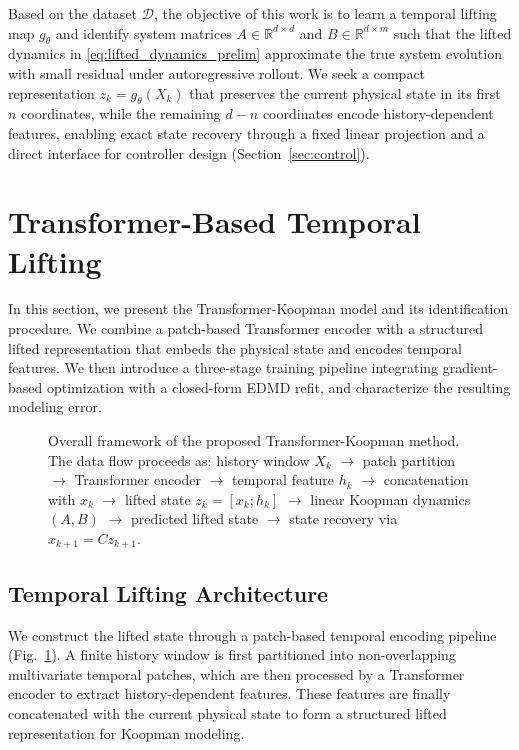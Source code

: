 \documentclass[journal]{IEEEtran}
\begin{document}
Based on the dataset $\mathcal{D}$, the objective of this work is to learn a temporal lifting map $g_\theta$ and identify system matrices $A \in \mathbb{R}^{d\times d}$ and $B \in \mathbb{R}^{d\times m}$ such that the lifted dynamics in \eqref{eq:lifted_dynamics_prelim} approximate the true system evolution with small residual under autoregressive rollout. We seek a compact representation $z_k = g_\theta(X_k)$ that preserves the current physical state in its first $n$ coordinates, while the remaining $d-n$ coordinates encode history-dependent features, enabling exact state recovery through a fixed linear projection and a direct interface for controller design (Section~\ref{sec:control}).

\section{Transformer-Based Temporal Lifting}
\label{sec:methodology}

In this section, we present the Transformer-Koopman model and its identification procedure. We combine a patch-based Transformer encoder with a structured lifted representation that embeds the physical state and encodes temporal features. We then introduce a three-stage training pipeline integrating gradient-based optimization with a closed-form EDMD refit, and characterize the resulting modeling error.

\begin{figure}[!t]
    \centering
    \caption{Overall framework of the proposed Transformer-Koopman method. The data flow proceeds as: history window $X_k$ $\rightarrow$ patch partition $\rightarrow$ Transformer encoder $\rightarrow$ temporal feature $h_k$ $\rightarrow$ concatenation with $x_k$ $\rightarrow$ lifted state $z_k=[x_k;h_k]$ $\rightarrow$ linear Koopman dynamics $(A,B)$ $\rightarrow$ predicted lifted state $\rightarrow$ state recovery via $x_{k+1}=Cz_{k+1}$.}
    \label{fig:framework}
\end{figure}

\subsection{Temporal Lifting Architecture}
\label{sec:temporal_lifting}

We construct the lifted state through a patch-based temporal encoding pipeline (Fig.~\ref{fig:framework}). A finite history window is first partitioned into non-overlapping multivariate temporal patches, which are then processed by a Transformer encoder to extract history-dependent features. These features are finally concatenated with the current physical state to form a structured lifted representation for Koopman modeling.
\end{document}
